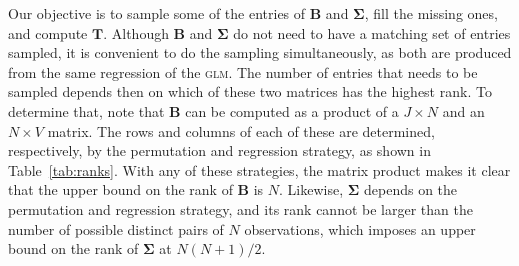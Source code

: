 Our objective is to sample some of the entries of $\mathbf{B}$ and $\boldsymbol{\Sigma}$, fill the missing ones, and compute $\mathbf{T}$. Although $\mathbf{B}$ and $\boldsymbol{\Sigma}$ do not need to have a matching set of entries sampled, it is convenient to do the sampling simultaneously, as both are produced from the same regression of the \textsc{glm}. The number of entries that needs to be sampled depends then on which of these two matrices has the highest rank. To determine that, note that $\mathbf{B}$ can be computed as a product of a $J \times N$ and an $N \times V$ matrix. The rows and columns of each of these are determined, respectively, by the permutation and regression strategy, as shown in Table~\ref{tab:ranks}. With any of these strategies, the matrix product makes it clear that the upper bound on the rank of $\mathbf{B}$ is $N$. Likewise, $\boldsymbol{\Sigma}$ depends on the permutation and regression strategy, and its rank cannot be larger than the number of possible distinct pairs of $N$ observations, which imposes an upper bound on the rank of $\boldsymbol{\Sigma}$ at $N(N+1)/2$.

